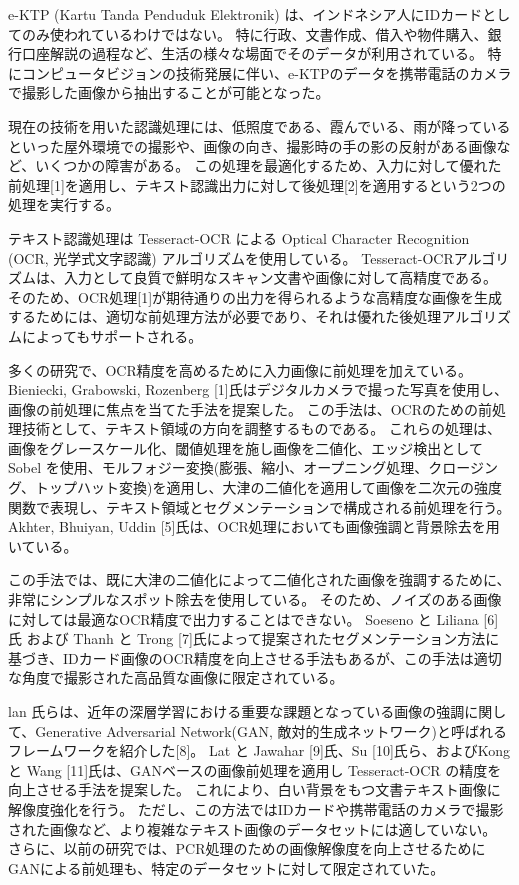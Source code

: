\documentclass[uplatex, twocolumn,10pt]{jsarticle}
\begin{document}
e-KTP (Kartu Tanda Penduduk Elektronik) は、インドネシア人にIDカードとしてのみ使われているわけではない。
特に行政、文書作成、借入や物件購入、銀行口座解説の過程など、生活の様々な場面でそのデータが利用されている。
特にコンピュータビジョンの技術発展に伴い、e-KTPのデータを携帯電話のカメラで撮影した画像から抽出することが可能となった。

現在の技術を用いた認識処理には、低照度である、霞んでいる、雨が降っているといった屋外環境での撮影や、画像の向き、撮影時の手の影の反射がある画像など、いくつかの障害がある。
この処理を最適化するため、入力に対して優れた前処理[1]を適用し、テキスト認識出力に対して後処理[2]を適用するという2つの処理を実行する。

テキスト認識処理は Tesseract-OCR による Optical Character Recognition (OCR, 光学式文字認識) アルゴリズムを使用している。
Tesseract-OCRアルゴリズムは、入力として良質で鮮明なスキャン文書や画像に対して高精度である。
そのため、OCR処理[1]が期待通りの出力を得られるような高精度な画像を生成するためには、適切な前処理方法が必要であり、それは優れた後処理アルゴリズムによってもサポートされる。

多くの研究で、OCR精度を高めるために入力画像に前処理を加えている。
Bieniecki, Grabowski, Rozenberg [1]氏はデジタルカメラで撮った写真を使用し、画像の前処理に焦点を当てた手法を提案した。
この手法は、OCRのための前処理技術として、テキスト領域の方向を調整するものである。
これらの処理は、画像をグレースケール化、閾値処理を施し画像を二値化、エッジ検出として Sobel を使用、モルフォジー変換(膨張、縮小、オープニング処理、クロージング、トップハット変換)を適用し、大津の二値化を適用して画像を二次元の強度関数で表現し、テキスト領域とセグメンテーションで構成される前処理を行う。
Akhter, Bhuiyan, Uddin [5]氏は、OCR処理においても画像強調と背景除去を用いている。

この手法では、既に大津の二値化によって二値化された画像を強調するために、非常にシンプルなスポット除去を使用している。
そのため、ノイズのある画像に対しては最適なOCR精度で出力することはできない。
Soeseno と Liliana [6]氏 および Thanh と Trong [7]氏によって提案されたセグメンテーション方法に基づき、IDカード画像のOCR精度を向上させる手法もあるが、この手法は適切な角度で撮影された高品質な画像に限定されている。

lan 氏らは、近年の深層学習における重要な課題となっている画像の強調に関して、Generative Adversarial Network(GAN, 敵対的生成ネットワーク)と呼ばれるフレームワークを紹介した[8]。
Lat と Jawahar [9]氏、Su [10]氏ら、およびKong と Wang [11]氏は、GANベースの画像前処理を適用し Tesseract-OCR の精度を向上させる手法を提案した。
これにより、白い背景をもつ文書テキスト画像に解像度強化を行う。
ただし、この方法ではIDカードや携帯電話のカメラで撮影された画像など、より複雑なテキスト画像のデータセットには適していない。
さらに、以前の研究では、PCR処理のための画像解像度を向上させるためにGANによる前処理も、特定のデータセットに対して限定されていた。
\end{document}
